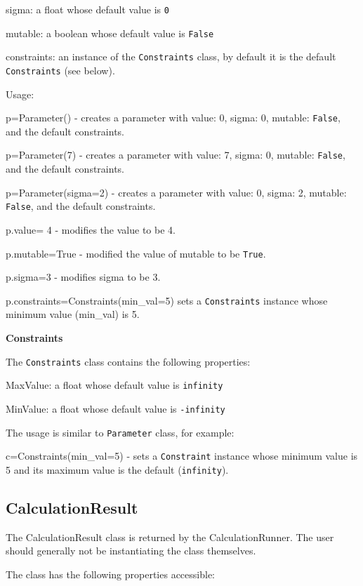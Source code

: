 \documentclass[../D+Manual.tex]{subfiles}
\begin{document}
sigma: a float whose default value is \texttt{0}

mutable: a boolean whose default value is \texttt{False}

constraints: an instance of the \texttt{Constraints} class, by default it is the
default \texttt{Constraints}  (see below).

Usage:

p=Parameter()  - creates a parameter with value: 0, sigma: 0, mutable: \texttt{False}, and the default constraints.

p=Parameter(7) - creates a parameter with value: 7, sigma: 0, mutable: \texttt{False}, and the default constraints.

p=Parameter(sigma=2)   - creates a parameter with value: 0, sigma: 2, mutable: \texttt{False}, and the default constraints.

p.value= 4  - modifies the value to be 4.

p.mutable=True  - modified the value of mutable to be \texttt{True}.

p.sigma=3 - modifies sigma to be 3.

p.constraints=Constraints(min\_val=5) sets a \texttt{Constraints} instance whose minimum value (min\_val) is 5.

\textbf{Constraints}

The \texttt{Constraints} class contains the following properties:

MaxValue: a float whose default value is \texttt{infinity}

MinValue: a float whose default value is \texttt{-infinity}

The usage is similar to \texttt{Parameter} class, for example:

c=Constraints(min\_val=5) - sets a \texttt{Constraint} instance whose minimum value is 5 and its maximum value is the default (\texttt{infinity}).


\subsection{CalculationResult}\label{calculationresult}

The CalculationResult class is returned by the CalculationRunner. The
user should generally not be instantiating the class themselves.

The class has the following properties accessible:
\end{document}
